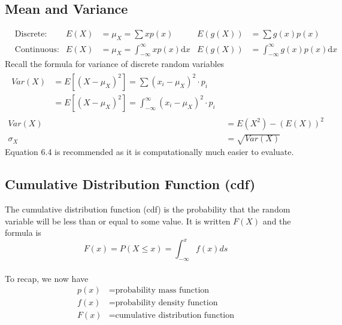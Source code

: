 \subsection{Mean and Variance}  %
\begin{align}
     & \text{Discrete:}   & E(X) & =\mu_X=\sum xp(x)                             & E(g(X)) & =\sum g(x)p(x)                            \\
     & \text{Continuous:} & E(X) & =\mu_X=\int_{-\infty}^{\infty} xp(x)\text{d}x & E(g(X)) & =\int_{-\infty}^{\infty}g(x)p(x)\text{d}x
\end{align}
Recall the formula for variance of discrete random variables
\begin{align}
    \begin{split}
        Var(X) & =E[{(X-\mu_X)}^2]=\sum{(x_i-\mu_X)}^2\cdot p_i                  \\
               & =E[{(X-\mu_X)}^2]=\int_{-\infty}^\infty{(x_i-\mu_X)}^2\cdot p_i
    \end{split} \\
    Var(X)   & =E(X^2)-(E(X))^2                                              \\
    \sigma_X & =\sqrt{Var(X)}
\end{align}
Equation 6.4 is recommended as it is computationally much easier to evaluate.

\subsection{Cumulative Distribution Function (cdf)}  %
The cumulative distribution function (cdf) is the probability that the random variable will be less than or equal to some value. It is written $F(X)$ and the formula is
\begin{equation}
    F(x)=P(X\leq x)=\int_{-\infty}^{x} f(x)ds
\end{equation}
\\
To recap, we now have
\begin{align}
    p(x) & = \text{probability mass function}        \\
    f(x) & = \text{probability density function}     \\
    F(x) & = \text{cumulative distribution function}
\end{align}

